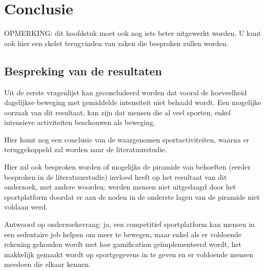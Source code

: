 
\chapter{Conclusie}%
\label{ch:conclusie}

OPMERKING: dit hoofdstuk moet ook nog iets beter uitgewerkt worden. U kunt ook hier een skelet terugvinden van zaken die besproken zullen worden.


\section{Bespreking van de resultaten}

Uit de eerste vragenlijst kan geconcludeerd worden dat vooral de hoeveelheid dagelijkse beweging met gemiddelde intensiteit niet behaald wordt. Een mogelijke oorzaak van dit resultaat, kan zijn dat mensen die al veel sporten, enkel intensieve activiteiten beschouwen als beweging.

Hier komt nog een conclusie van de waargenomen sportactiviteiten, waarna er teruggekoppeld zal worden naar de literatuurstudie.

Hier zal ook besproken worden of mogelijks de piramide van behoeften (eerder besproken in de literatuurstudie) invloed heeft op het resultaat van dit onderzoek, met andere woorden: werden mensen niet uitgedaagd door het sportplatform doordat er aan de noden in de onderste lagen van de piramide niet voldaan werd.

Antwoord op onderzoeksvraag: ja, een competitief sportplatform kan mensen in een sedentaire job helpen om meer te bewegen, maar enkel als
er voldoende rekening gehouden wordt met hoe gamification geïmplementeerd wordt,
het makkelijk gemaakt wordt op sportgegevens in te geven en er voldoende mensen meedoen die elkaar kennen.

